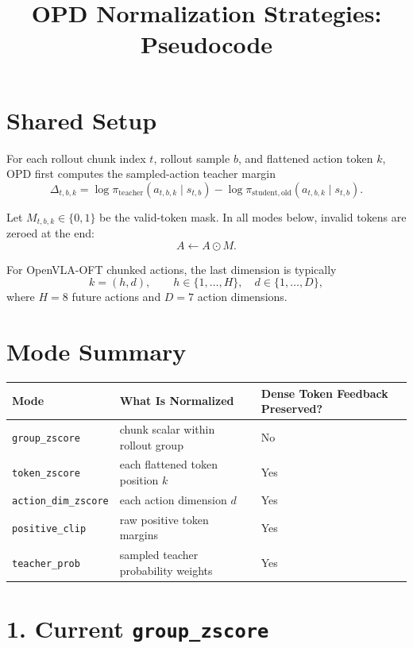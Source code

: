 \documentclass[10pt]{article}
\title{\vspace{-2em}OPD Normalization Strategies: Pseudocode}
\author{}
\date{}
\newcommand{\code}[1]{\texttt{#1}}
\newcommand{\Margin}{\Delta}
\newcommand{\Mask}{M}
\newcommand{\Adv}{A}
\begin{document}
\maketitle
\vspace{-2em}

\section*{Shared Setup}

For each rollout chunk index $t$, rollout sample $b$, and flattened action token
$k$, OPD first computes the sampled-action teacher margin
\[
  \Margin_{t,b,k}
  =
  \log \pi_{\mathrm{teacher}}(a_{t,b,k}\mid s_{t,b})
  -
  \log \pi_{\mathrm{student,old}}(a_{t,b,k}\mid s_{t,b}).
\]

Let $\Mask_{t,b,k}\in\{0,1\}$ be the valid-token mask. In all modes below, invalid
tokens are zeroed at the end:
\[
  \Adv \leftarrow \Adv \odot \Mask.
\]

For OpenVLA-OFT chunked actions, the last dimension is typically
\[
  k = (h,d), \qquad h\in\{1,\ldots,H\}, \quad d\in\{1,\ldots,D\},
\]
where $H=8$ future actions and $D=7$ action dimensions.

\section*{Mode Summary}

\begin{center}
\begin{tabular}{@{}lll@{}}
\toprule
Mode & What Is Normalized & Dense Token Feedback Preserved? \\
\midrule
\code{group\_zscore} & chunk scalar within rollout group & No \\
\code{token\_zscore} & each flattened token position $k$ & Yes \\
\code{action\_dim\_zscore} & each action dimension $d$ & Yes \\
\code{positive\_clip} & raw positive token margins & Yes \\
\code{teacher\_prob} & sampled teacher probability weights & Yes \\
\bottomrule
\end{tabular}
\end{center}

\section*{1. Current \code{group\_zscore}}
\end{document}
